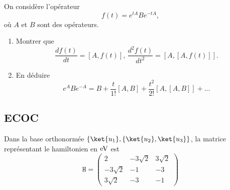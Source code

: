 \label{sec:IdOp1} On considère l'opérateur
\begin{equation}
f(t)=e^{tA}Be^{-tA},
\end{equation}
où $A$ et $B$ sont des opérateurs.

\begin{enumerate}
\item Montrer que%
\begin{equation}
\frac{df(t)}{dt}=[A,f(t)],\,\frac{d^2f(t)}{dt^2}=[A,[A,f(t)]].
\end{equation}

\item En déduire
\begin{equation}
e^{A}Be^{-A}=B+\frac{t}{1!}[A,B]+\frac{t^{2}}{2!}[A,[A,B]]+\ldots
\end{equation}

\end{enumerate}

\subsection{ECOC}
\label{sec:ExoECOC}
Dans la base orthonormée $\{\ket{u_1},\{\ket{u_2},\ket{u_3}\}$, la matrice
représentant le hamiltonien en $\operatorname{eV}$ est%
\begin{equation}
\mathtt{H}=\begin{pmatrix}
2 & -3\sqrt{2} & 3\sqrt{2}\\
-3\sqrt{2} & -1 & -3\\
3\sqrt{2} & -3 & -1
\end{pmatrix}
\end{equation}


